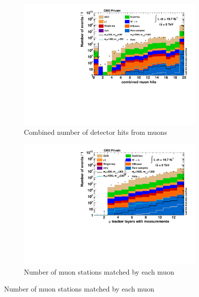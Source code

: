 \begin{figure}[!htbp]
  \ContinuedFloat
  \centering
  \begin{subfigure}[b]{0.495\textwidth}
    \centering
    \includegraphics[width=\textwidth]{plots/nMuon_hits.pdf}
    \caption{Combined number of detector hits from muons\label{fig:muo_hits}}
  \end{subfigure}
  \begin{subfigure}[b]{0.495\textwidth}
    \centering
    \includegraphics[width=\textwidth]{plots/nMuon_StationsMatched.pdf}
    \caption{Number of muon stations matched by each muon\label{fig:muo_stationsmatched}}
  \end{subfigure}
\end{figure}

